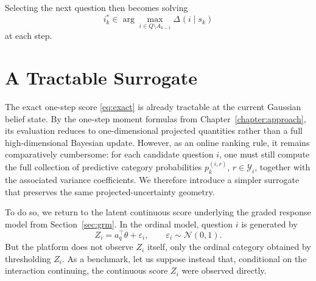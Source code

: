 \documentclass{article}
\begin{document}
Selecting the next question then becomes solving
\begin{equation}\label{eq:myopic_exact}
i_k^{*} \in \arg\max_{i\in Q\setminus A_{k-1}} \Delta_{ }(i\mid s_k)
\end{equation}
at each step.

\section{A Tractable Surrogate}\label{sec:surrogate}
The exact one-step score \eqref{eq:exact} is already tractable at the current Gaussian
belief state. By the one-step moment formulas from Chapter~\ref{chapter:approach},
its evaluation reduces to one-dimensional projected quantities rather than a full
high-dimensional Bayesian update. However, as an online ranking rule, it remains
comparatively cumbersome: for each candidate question $i$, one must still compute the
full collection of predictive category probabilities $p_k^{(i,r)}$, $r\in\mathcal Y_i$,
together with the associated variance coefficients. We therefore introduce a simpler
surrogate that preserves the same projected-uncertainty geometry.

To do so, we return to the latent continuous score underlying the graded response
model from Section~\ref{sec:grm}. In the ordinal model, question $i$ is generated by
\begin{equation*}
Z_i = a_q^\top \theta + \varepsilon_i,
\qquad
\varepsilon_i \sim \mathcal N(0,1).
\end{equation*}
But the platform does not observe $Z_i$ itself, only the ordinal category
obtained by thresholding $Z_i$. As a benchmark, let us suppose instead that, conditional
on the interaction continuing, the continuous score $Z_i$ were observed directly. 
\end{document}
